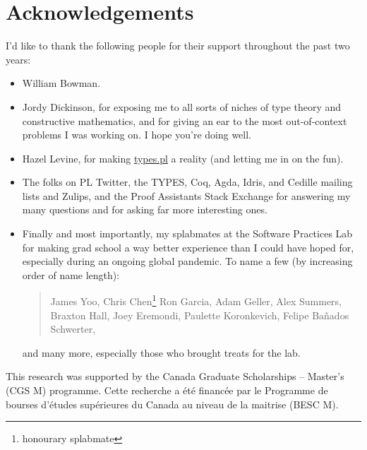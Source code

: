 \chapter{Acknowledgements}

I'd like to thank the following people for their support throughout the past two years:

\begin{itemize}
  \item William Bowman.
  \item Jordy Dickinson, for exposing me to all sorts of niches of type theory and constructive mathematics,
    and for giving an ear to the most out-of-context problems I was working on.
    I hope you're doing well.
  \item Hazel Levine, for making \href{https://types.pl/}{types.pl} a reality (and letting me in on the fun).
  \item The folks on PL Twitter, the TYPES, Coq, Agda, Idris, and Cedille mailing lists and Zulips,
    and the Proof Assistants Stack Exchange for answering my many questions
    and for asking far more interesting ones.
  \item Finally and most importantly, my splabmates at the Software Practices Lab
    for making grad school a way better experience than I could have hoped for,
    especially during an ongoing global pandemic.
    To name a few (by increasing order of name length):
    \begin{quote}
    James Yoo, Chris Chen\punctstack{,}\footnote{honourary splabmate} Ron Garcia, Adam Geller, Alex Summers,
    Braxton Hall, Joey Eremondi, Paulette Koronkevich, Felipe Ba\~nados Schwerter,
    \end{quote}
    and many more, especially those who brought treats for the lab.
\end{itemize}

\vfill

This research was supported by the Canada Graduate Scholarships -- Master’s (CGS M) programme.
Cette recherche a \'et\'e financ\'ee par le Programme de bourses d'\'etudes sup\'erieures
du Canada au niveau de la maitrise (BESC M).

\hfill